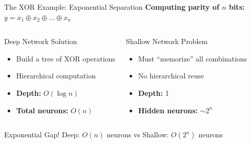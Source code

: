 \documentclass[xcolor=svgnames, 10pt, handout, standalone]{beamer}
\newcommand{\1}{\mathbf{1}}
\begin{document}
\begin{frame}{The XOR Example: Exponential Separation}
\textbf{Computing parity of $n$ bits:} $y = x_1 \oplus x_2 \oplus \ldots \oplus x_n$

\vspace{0.5em}
\begin{columns}[T]
\begin{block}{Deep Network Solution}
\begin{itemize}
    \item Build a tree of XOR operations
    \item Hierarchical computation
    \item \textbf{Depth:} $O(\log n)$
    \item \textbf{Total neurons:} $O(n)$
\end{itemize}
\end{block}

\begin{block}{Shallow Network Problem}
\begin{itemize}
    \item Must ``memorize'' all combinations
    \item No hierarchical reuse
    \item \textbf{Depth:} 1
    \item \textbf{Hidden neurons:} $\sim 2^n$
\end{itemize}
\end{block}
\end{columns}

\pause
\vspace{0.5em}
\begin{alertblock}{Exponential Gap!}
Deep: $O(n)$ neurons vs Shallow: $O(2^n)$ neurons
\end{alertblock}
\end{frame}
\end{document}
